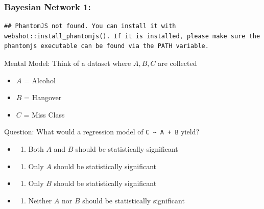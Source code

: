 \documentclass[
]{article}
\providecommand{\tightlist}{%
  \setlength{\itemsep}{0pt}\setlength{\parskip}{0pt}}
\begin{document}
\hypertarget{bayesian-network-1}{%
\subsubsection{Bayesian Network 1:}\label{bayesian-network-1}}

\begin{verbatim}
## PhantomJS not found. You can install it with webshot::install_phantomjs(). If it is installed, please make sure the phantomjs executable can be found via the PATH variable.
\end{verbatim}

\hypertarget{htmlwidget-3ea9a80d501e9cc59060}{}
\begin{grViz}

\end{grViz}

Mental Model: Think of a dataset where \(A,B,C\) are collected

\begin{itemize}
\tightlist
\item
  \(A\) = Alcohol
\item
  \(B\) = Hangover
\item
  \(C\) = Miss Class
\end{itemize}

Question: What would a regression model of
\texttt{C\ \textasciitilde{}\ A\ +\ B} yield?

\begin{itemize}
\item
  \begin{enumerate}
  \def\labelenumi{\alph{enumi})}
  \tightlist
  \item
    Both \(A\) and \(B\) should be statistically significant
  \end{enumerate}
\item
  \begin{enumerate}
  \def\labelenumi{\alph{enumi})}
  \setcounter{enumi}{1}
  \tightlist
  \item
    Only \(A\) should be statistically significant
  \end{enumerate}
\item
  \begin{enumerate}
  \def\labelenumi{\alph{enumi})}
  \setcounter{enumi}{2}
  \tightlist
  \item
    Only \(B\) should be statistically significant
  \end{enumerate}
\item
  \begin{enumerate}
  \def\labelenumi{\alph{enumi})}
  \setcounter{enumi}{3}
  \tightlist
  \item
    Neither \(A\) nor \(B\) should be statistically significant
  \end{enumerate}
\end{itemize}
\end{document}
